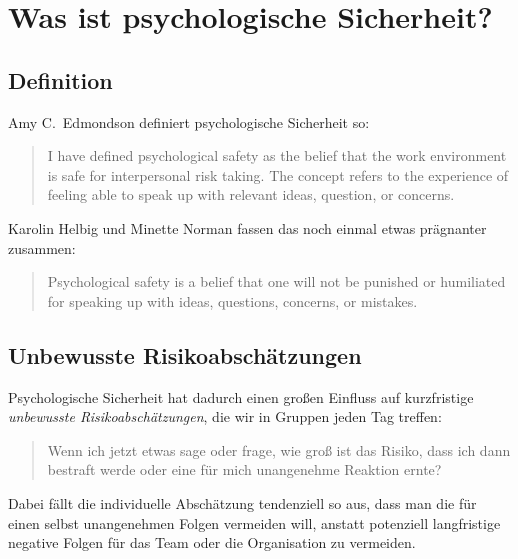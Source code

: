 \section{Was ist psychologische Sicherheit?}

\subsection{Definition}
\label{ps-definition}

Amy C.~Edmondson \cite{the-fearless-organisation} definiert psychologische Sicherheit so:

\begin{quote}
  I have defined psychological safety as the belief that the work environment is safe for interpersonal risk taking. The concept refers to the experience of feeling able to speak up with relevant ideas, question, or concerns.
\end{quote}

Karolin Helbig und Minette Norman \cite{psychological-safety-playbook} fassen das noch einmal etwas prägnanter zusammen:

\begin{quote}
  Psychological safety is a belief that one will not be punished or humiliated for speaking up with ideas, questions, concerns, or mistakes.
\end{quote}


\subsection{Unbewusste Risikoabschätzungen}

Psychologische Sicherheit hat dadurch einen großen Einfluss auf kurzfristige \emph{unbewusste Risikoabschätzungen}, die wir in Gruppen jeden Tag treffen:

\begin{quote}
  \glqq Wenn ich jetzt etwas sage oder frage, wie groß ist das Risiko, dass ich dann bestraft werde oder eine für mich unangenehme Reaktion ernte?\grqq
\end{quote}

Dabei fällt die individuelle Abschätzung tendenziell so aus, dass man die für einen selbst unangenehmen Folgen vermeiden will, anstatt potenziell langfristige negative Folgen für das Team oder die Organisation zu vermeiden.

